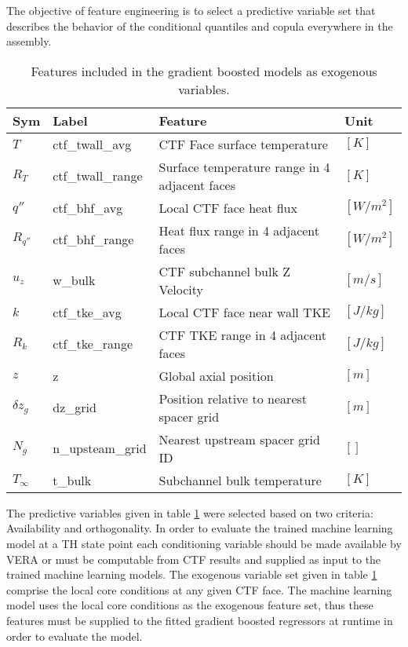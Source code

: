 The objective of feature engineering is to select a predictive variable set that describes the behavior of the conditional quantiles and copula everywhere in the assembly.

\begin{table}[h]
    \begin{center}
    \caption[Included exogenous training features.]{Features included in the gradient boosted models as exogenous variables.}
\begin{tabular}[h]{|l | l | l | l |}
    \hline
    Sym & Label & Feature & Unit \\
    \hline
    \hline
    $T$ & ctf\_twall\_avg & CTF Face surface temperature & $[K]$ \\
    $R_T$ & ctf\_twall\_range & Surface temperature range in 4 adjacent faces & $[K]$ \\
    $q''$ & ctf\_bhf\_avg & Local CTF face heat flux & $[W/m^2]$ \\
    $R_{q''}$ & ctf\_bhf\_range & Heat flux range in 4 adjacent faces & $[W/m^2]$ \\
    $u_z$ & w\_bulk & CTF subchannel bulk Z Velocity &  $[m/s]$ \\
    $k$ & ctf\_tke\_avg & Local CTF face near wall TKE &  $[J/kg]$ \\
    $R_k$ & ctf\_tke\_range & CTF TKE range in 4 adjacent faces & $[J/kg]$ \\
    $z$ & z & Global axial position & $[m]$ \\
    $\delta z_g$ & dz\_grid & Position relative to nearest spacer grid & $[m]$ \\
    $N_g$ & n\_upsteam\_grid  & Nearest upstream spacer grid ID & $[]$ \\
    $T_\infty$ & t\_bulk & Subchannel bulk temperature  &  $[K]$ \\
    \hline
\end{tabular}
\label{tab:features}
\end{center}
\end{table}

The predictive variables given in table \ref{tab:features} were selected based on two criteria:  Availability and orthogonality.  In order to evaluate the trained machine learning model at a TH state point each conditioning variable should be made available by VERA or must be computable from CTF results and supplied as input to the trained machine learning models.   The exogenous variable set given in table \ref{tab:features} comprise the local core conditions at any given CTF face.  The machine learning model uses the local core conditions as the exogenous feature set, thus these features must be supplied to the fitted gradient boosted regressors at runtime in order to evaluate the model.


